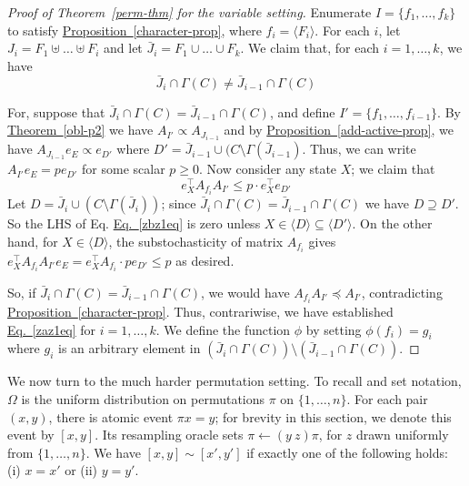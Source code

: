 \documentclass[11pt]{article}
\newcommand{\expref}[2]{\texorpdfstring{\hyperref[#2]{#1~\ref{#2}}}{#1~\ref{#2}}}
\newcommand{\expeqref}[2]{\texorpdfstring{\hyperref[#2]{#1~\eqref{#2}}}{#1~\eqref{#2}}}
\begin{document}
\begin{proof}[Proof of Theorem~\ref{perm-thm} for the variable setting]
Enumerate $I = \{ f_1, \dots, f_k \}$ to satisfy \expref{Proposition}{character-prop}, where $f_i = \langle F_i \rangle$. For each $i$, let $J_i = F_1 \uplus \dots \uplus F_i$ and let $\bar J_i = F_1 \cup \dots \cup F_k$. We claim that, for each $i = 1, \dots, k$, we have
\begin{equation}
\label{zaz1eq}
\bar J_i \cap \Gamma(C) \neq \bar J_{i-1} \cap \Gamma(C)
\end{equation}


For, suppose that $\bar J_i \cap \Gamma(C) = \bar J_{i-1} \cap \Gamma(C)$, and define $I' = \{f_1, \dots, f_{i-1} \}$. By \expref{Theorem}{obl-p2} we have $A_{I'} \propto A_{J_{i-1}}$ and by \expref{Proposition}{add-active-prop}, we have $A_{J_{i-1}} e_E \propto e_{D'}$ where $D' =\bar J_{i-1} \cup (C \setminus \Gamma(\bar J_{i-1})$. Thus, we can write $A_{I'} e_E = p e_{D'}$ for some scalar  $p \geq 0$.  Now consider any state $X$; we claim that 
\begin{equation}
\label{zbz1eq}
e_{X}^{\top} A_{f_i} A_{I'} \leq p \cdot e_{X}^{\top} e_{D'}
\end{equation}
 Let $D = \bar J_i \cup (C \setminus \Gamma(\bar J_i))$; since $\bar J_i \cap \Gamma(C) = \bar J_{i-1} \cap \Gamma(C)$ we have $D \supseteq D'$. So the LHS of 
Eq.  %
\expeqref{Eq.}{zbz1eq} is zero unless $X \in \langle D \rangle \subseteq \langle D' \rangle$. On the other hand, for $X \in \langle D \rangle$, the substochasticity of matrix $A_{f_i}$ gives $  e_{X}^{\top} A_{f_i} A_{I'} e_E = e_{X}^{\top} A_{f_i} \cdot p e_{D'}  \leq p$  as desired.
  
  So, if $\bar J_i \cap \Gamma(C) = \bar J_{i-1} \cap \Gamma(C)$, we would have $  A_{f_i} A_{I'} \preceq A_{I'}$, contradicting \expref{Proposition}{character-prop}.  Thus, contrariwise, we have established \expeqref{Eq.}{zaz1eq} for $i =1, \dots, k$. We define the function $\phi$ by setting $\phi( f_i ) = g_i$ where $g_i$ is an arbitrary element in $(\bar J_i \cap \Gamma(C)) \setminus (\bar J_{i-1} \cap \Gamma(C))$.
\end{proof}

\bigskip
We now turn to the much harder  permutation setting. To recall and set notation, $\Omega$ is the uniform distribution on permutations $\pi$ on $\{1, \dots, n \}$. For each pair $(x,y)$, there is atomic event $\pi x = y$; for brevity in this section, we denote this event by $[x, y]$. Its resampling oracle sets $\pi \leftarrow (y \ z) \pi$, for $z$ drawn uniformly from $\{1, \dots, n\}$. We have $[x,y] \sim [x', y']$ if exactly one of the following holds: (i) $x = x'$ or (ii) $y = y'$. 
\end{document}
